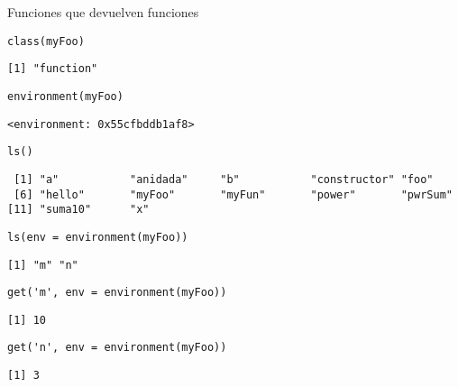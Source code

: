 \documentclass[xcolor={usenames,svgnames,dvipsnames}]{beamer}
\begin{document}
\begin{frame}[fragile,label={sec:org4ba6aaf}]{Funciones que devuelven funciones}
 \lstset{language=r,label= ,caption= ,captionpos=b,numbers=none}
\begin{lstlisting}
class(myFoo)
\end{lstlisting}

\begin{verbatim}
[1] "function"
\end{verbatim}

\lstset{language=r,label= ,caption= ,captionpos=b,numbers=none}
\begin{lstlisting}
environment(myFoo)
\end{lstlisting}

\begin{verbatim}
<environment: 0x55cfbddb1af8>
\end{verbatim}

\lstset{language=r,label= ,caption= ,captionpos=b,numbers=none}
\begin{lstlisting}
ls()
\end{lstlisting}

\begin{verbatim}
 [1] "a"           "anidada"     "b"           "constructor" "foo"        
 [6] "hello"       "myFoo"       "myFun"       "power"       "pwrSum"     
[11] "suma10"      "x"
\end{verbatim}

\lstset{language=r,label= ,caption= ,captionpos=b,numbers=none}
\begin{lstlisting}
ls(env = environment(myFoo))
\end{lstlisting}

\begin{verbatim}
[1] "m" "n"
\end{verbatim}

\lstset{language=r,label= ,caption= ,captionpos=b,numbers=none}
\begin{lstlisting}
get('m', env = environment(myFoo))
\end{lstlisting}

\begin{verbatim}
[1] 10
\end{verbatim}

\lstset{language=r,label= ,caption= ,captionpos=b,numbers=none}
\begin{lstlisting}
get('n', env = environment(myFoo))
\end{lstlisting}

\begin{verbatim}
[1] 3
\end{verbatim}
\end{frame}
\end{document}
